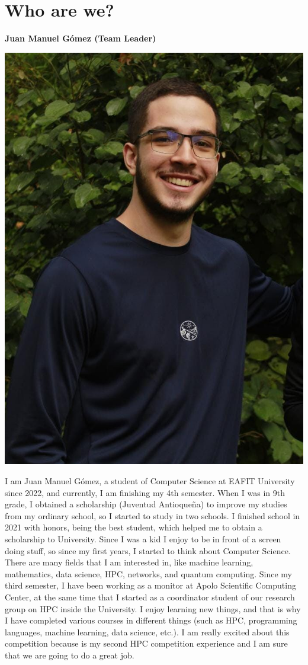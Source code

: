 \documentclass[11pt,a4paper,twocolumn]{article}
\begin{document}
\setlength{\parindent}{4em}
%



\section{Who are we?}

\begin{center}
    \textbf{Juan Manuel Gómez (Team Leader)}
\end{center}
\begin{center}
	\includegraphics[width = .45\linewidth]{Images/Juan Gomez.jpeg}
\end{center}
I am Juan Manuel Gómez, a student of Computer Science at EAFIT University since 2022, and currently, I am finishing my 4th semester. When I was in 9th grade, I obtained a scholarship (Juventud Antioqueña) to improve my studies from my ordinary school, so I started to study in two schools. I finished school in 2021 with honors, being the best student, which helped me to obtain a scholarship to University. Since I was a kid I enjoy to be in front of a screen doing stuff, so since my first years, I started to think about Computer Science. There are many fields that I am interested in, like machine learning, mathematics, data science, HPC, networks, and quantum computing. Since my third semester, I have been working as a monitor at Apolo Scientific Computing Center, at the same time that I started as a coordinator student of our research group on HPC inside the University. I enjoy learning new things, and that is why I have completed various courses in different things (such as HPC, programming languages, machine learning, data science, etc.). I am really excited about this competition because is my second HPC competition experience and I am sure that we are going to do a great job.
\end{document}
